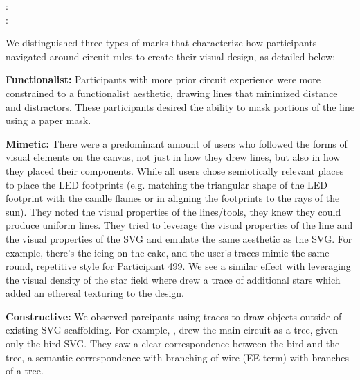 \documentclass{sigchi}
\begin{document}
  : 
  \\
  : 

  We distinguished three types of marks that characterize how participants navigated around circuit rules to create their visual design, as detailed below: 

  \textbf{Functionalist:} Participants with more prior circuit experience were more constrained to a functionalist aesthetic, drawing lines that minimized distance and distractors. These participants desired the ability to mask portions of the line using a paper mask. 


  \textbf{Mimetic:}  There were a predominant amount of users who followed the forms of visual elements on the canvas, not just in how they drew lines, but also in how they placed their components. While all users chose semiotically relevant places to place the LED footprints (e.g. matching the triangular shape of the LED footprint with the candle flames or in aligning the footprints to the rays of the sun). 
  They noted the visual properties of the lines/tools, they knew they could produce uniform lines. They tried to leverage the visual properties of the line and the visual properties of the SVG and emulate the same aesthetic as the SVG. For example, there's the icing on the cake, and the user's traces mimic the same round, repetitive style for Participant 499.   
  We see a similar effect with leveraging the visual density of the star field where  drew a trace of additional stars which added an ethereal texturing to the design.


  \textbf{Constructive:} We observed parcipants using traces to draw objects outside of existing SVG scaffolding. For example, , drew the main circuit as a tree, given only the bird SVG. They saw a clear correspondence between the bird and the tree, a semantic correspondence with branching of wire (EE term) with branches of a tree.
\end{document}
